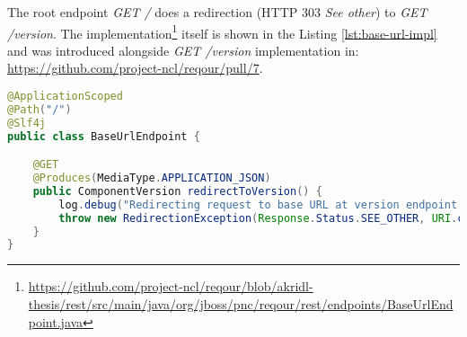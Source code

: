 \documentclass[../main.tex]{subfiles}
\begin{document}
The root endpoint \textit{GET /} does a redirection (HTTP 303 \textit{See other}) to \textit{GET /version}. The implementation\footnote{\url{https://github.com/project-ncl/reqour/blob/akridl-thesis/rest/src/main/java/org/jboss/pnc/reqour/rest/endpoints/BaseUrlEndpoint.java}} itself is shown in the Listing \ref{lst:base-url-impl} and was introduced alongside \textit{GET /version} implementation in: \url{https://github.com/project-ncl/reqour/pull/7}.

\begin{lstlisting}[language=Java, caption=Implementation of the root endpoint handler, label={lst:base-url-impl}]
@ApplicationScoped
@Path("/")
@Slf4j
public class BaseUrlEndpoint {

    @GET
    @Produces(MediaType.APPLICATION_JSON)
    public ComponentVersion redirectToVersion() {
        log.debug("Redirecting request to base URL at version endpoint handler");
        throw new RedirectionException(Response.Status.SEE_OTHER, URI.create("/version"));
    }
}
\end{lstlisting}
\end{document}
